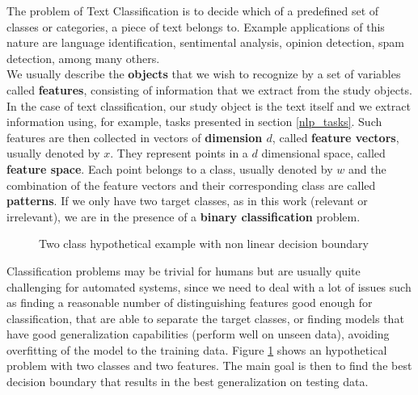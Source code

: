 The problem of Text Classification is to decide which of a predefined set of classes or categories, a piece of text belongs to. Example applications of this nature are language identification, sentimental analysis, opinion detection, spam detection, among many others.\\ %
We usually describe the \textbf{objects} that we wish to recognize by a set of variables called \textbf{features}, consisting of information that we extract from the study objects. In the case of text classification, our study object is the text itself and we extract information using, for example, tasks presented in section \ref{nlp_tasks}.
Such features are then collected in vectors of \textbf{dimension $d$}, called \textbf{feature vectors}, usually denoted by $x$. They represent points in a $d$ dimensional space, called \textbf{feature space}. Each point belongs to a class, usually denoted by $w$ and the combination of the feature vectors and their corresponding class are called \textbf{patterns}. If we only have two target classes, as in this work (relevant or irrelevant), we are in the presence of a \textbf{binary classification} problem. 

\begin{figure}[htp]
	\centering
	\caption[Two class hypothetical example with non linear decision boundary]{Two class hypothetical example with non linear decision boundary}
	\label{fig:2-class-problem}
\end{figure}

Classification problems may be trivial for humans but are usually quite challenging for automated systems, since we need to deal with a lot of issues such as finding a reasonable number of distinguishing features good enough for classification, that are able to separate the target classes, or finding models that have good generalization capabilities (perform well on unseen data), avoiding overfitting of the model to the training data. Figure \ref{fig:2-class-problem} shows an hypothetical problem with two classes and two features. The main goal is then to find the best decision boundary that results in the best generalization on testing data. 

